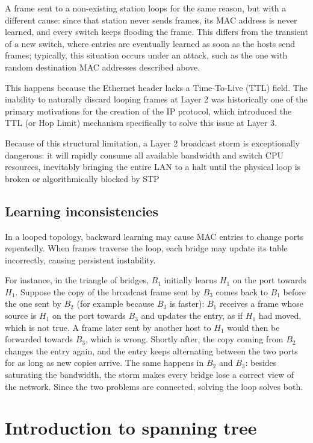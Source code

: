A frame sent to a non-existing station loops for the same reason, but with a different cause: since that station never sends frames, its MAC address is never learned, and every switch keeps flooding the frame. This differs from the transient of a new switch, where entries are eventually learned as soon as the hosts send frames; typically, this situation occurs under an attack, such as the one with random destination MAC addresses described above.




This happens because the Ethernet header lacks a Time-To-Live (TTL) field. The inability to naturally discard looping frames at Layer 2 was historically one of the primary motivations for the creation of the IP protocol, which introduced the TTL (or Hop Limit) mechanism specifically to solve this issue at Layer 3.

Because of this structural limitation, a Layer 2 broadcast storm is exceptionally dangerous: it will rapidly consume all available bandwidth and switch CPU resources, inevitably bringing the entire LAN to a halt until the physical loop is broken or algorithmically blocked by STP
\subsection{Learning inconsistencies}

In a looped topology, backward learning may cause MAC entries to change ports repeatedly. When frames traverse the loop, each bridge may update its table incorrectly, causing persistent instability.

For instance, in the triangle of bridges, $B_1$ initially learns $H_1$ on the port towards $H_1$. Suppose the copy of the broadcast frame sent by $B_3$ comes back to $B_1$ before the one sent by $B_2$ (for example because $B_3$ is faster): $B_1$ receives a frame whose source is $H_1$ on the port towards $B_3$ and updates the entry, as if $H_1$ had moved, which is not true. A frame later sent by another host to $H_1$ would then be forwarded towards $B_3$, which is wrong. Shortly after, the copy coming from $B_2$ changes the entry again, and the entry keeps alternating between the two ports for as long as new copies arrive. The same happens in $B_2$ and $B_3$: besides saturating the bandwidth, the storm makes every bridge lose a correct view of the network. Since the two problems are connected, solving the loop solves both.

\section{Introduction to spanning tree}

